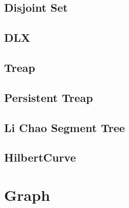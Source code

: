 \documentclass[a4paper,10pt,twocolumn,oneside]{article}
\begin{document}
\subsection{Disjoint Set}


\subsection{DLX}


\subsection{Treap}


\subsection{Persistent Treap}


\subsection{Li Chao Segment Tree}


\subsection{HilbertCurve}


% 

\section{Graph}

% 

% 
\end{document}
